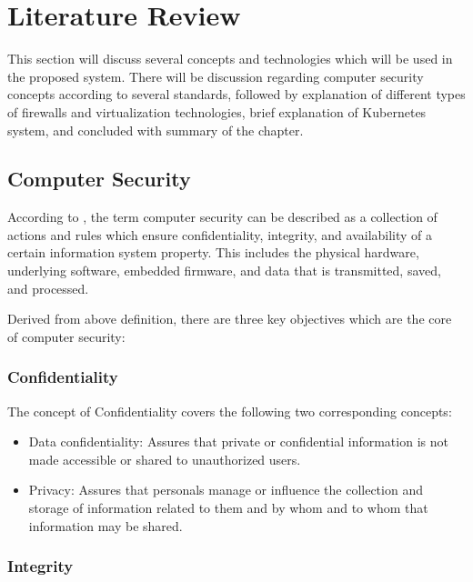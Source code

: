 \documentclass[conference]{IEEEtran}
\begin{document}
\section{Literature Review}

This section will discuss several concepts and technologies which will be used in the proposed
system. There will be discussion regarding computer security concepts according to several
standards, followed by explanation of different types of firewalls and virtualization technologies,
brief explanation of Kubernetes system, and concluded with summary of the chapter.

\subsection{Computer Security}

According to \cite{Paulsen_Byers_2019}, the term computer security can be described as a collection
of actions and rules which ensure confidentiality, integrity, and availability of a certain
information system property. This includes the physical hardware, underlying software, embedded
firmware, and data that is transmitted, saved, and processed.

Derived from above definition, there are three key objectives which are the core of computer
security:

\subsubsection{Confidentiality}

The concept of Confidentiality covers the following two corresponding concepts:

\begin{itemize}

  \item Data confidentiality: Assures that private or confidential information is not made
    accessible or shared to unauthorized users.

  \item Privacy: Assures that personals manage or influence the collection and storage of
    information related to them and by whom and to whom that information may be shared.

\end{itemize}

\subsubsection{Integrity}
\end{document}
